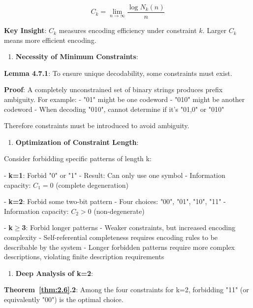 \begin{equation}
C_k = \lim_{n \to \infty} \frac{\log N_k(n)}{n}
\end{equation}
   
   \textbf{Key Insight}: $C_k$ measures encoding efficiency under constraint $k$. Larger $C_k$ means more efficient encoding.
   
\begin{enumerate}
\item \textbf{Necessity of Minimum Constraints}:
\end{enumerate}
   
   \textbf{Lemma 4.7.1}: To ensure unique decodability, some constraints must exist.
\label{thm:2.6}
   
   \textbf{Proof}: A completely unconstrained set of binary strings produces prefix ambiguity. For example:
   - "01" might be one codeword
   - "010" might be another codeword
   - When decoding "010", cannot determine if it's "01,0" or "010"
   
   Therefore constraints must be introduced to avoid ambiguity.
   
\begin{enumerate}
\item \textbf{Optimization of Constraint Length}:
\end{enumerate}
   Consider forbidding specific patterns of length k:
   
   - \textbf{k=1}: Forbid "0" or "1" 
     - Result: Can only use one symbol
     - Information capacity: $C_1 = 0$ (complete degeneration)
   
   - \textbf{k=2}: Forbid some two-bit pattern
     - Four choices: "00", "01", "10", "11"
     - Information capacity: $C_2 > 0$ (non-degenerate)
   
   - \textbf{k$\geq$3}: Forbid longer patterns
     - Weaker constraints, but increased encoding complexity
     - Self-referential completeness requires encoding rules to be describable by the system
     - Longer forbidden patterns require more complex descriptions, violating finite description requirements
   
\begin{enumerate}
\item \textbf{Deep Analysis of k=2}:
\end{enumerate}
   
   \textbf{Theorem~\ref{thm:2.6}.2}: Among the four constraints for k=2, forbidding "11" (or equivalently "00") is the optimal choice.
\label{thm:2.6}
   
